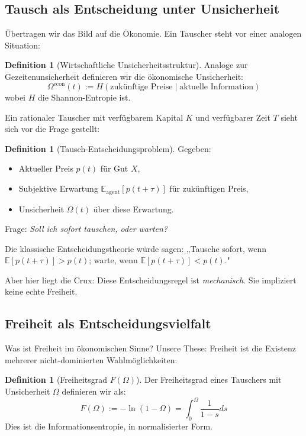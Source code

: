 \documentclass[a4paper, 12pt, twoside, openright]{report}
\theoremstyle{definition}
\newtheorem{definition}[theorem]{Definition}
\theoremstyle{definition}
\begin{document}
\subsection{Tausch als Entscheidung unter Unsicherheit}

Übertragen wir das Bild auf die Ökonomie. Ein Tauscher steht vor einer analogen Situation:

\begin{definition}[Wirtschaftliche Unsicherheitsstruktur]
    Analoge zur Gezeitenunsicherheit definieren wir die ökonomische Unsicherheit:
    \begin{equation}
        \Omega^{\text{econ}}(t) := H\left(\text{zukünftige Preise} \mid \text{aktuelle Information}\right)
    \end{equation}
    wobei $H$ die Shannon-Entropie ist.
\end{definition}

Ein rationaler Tauscher mit verfügbarem Kapital $K$ und verfügbarer Zeit $T$ sieht sich vor die Frage gestellt:

\begin{definition}[Tausch-Entscheidungsproblem]
    Gegeben:
    \begin{itemize}
        \item Aktueller Preis $p(t)$ für Gut $X$,
        \item Subjektive Erwartung $\mathbb{E}_{\text{agent}}[p(t+\tau)]$ für zukünftigen Preis,
        \item Unsicherheit $\Omega(t)$ über diese Erwartung.
    \end{itemize}
    Frage: \emph{Soll ich sofort tauschen, oder warten?}
\end{definition}

Die klassische Entscheidungstheorie würde sagen: „Tausche sofort, wenn $\mathbb{E}[p(t+\tau)] > p(t)$; warte, wenn $\mathbb{E}[p(t+\tau)] < p(t)$."

Aber hier liegt die Crux: Diese Entscheidungsregel ist \emph{mechanisch}. Sie impliziert keine echte Freiheit.

\subsection{Freiheit als Entscheidungsvielfalt}

Was ist Freiheit im ökonomischen Sinne? Unsere These: Freiheit ist die Existenz mehrerer nicht-dominierten Wahlmöglichkeiten.

\begin{definition}[Freiheitsgrad $F(\Omega)$]
    Der Freiheitsgrad eines Tauschers mit Unsicherheit $\Omega$ definieren wir als:
    \begin{equation}
        F(\Omega) := -\ln(1 - \Omega) = \int_0^{\Omega} \frac{1}{1-s} ds
    \end{equation}
    Dies ist die Informationsentropie, in normalisierter Form.
\end{definition}
\end{document}
